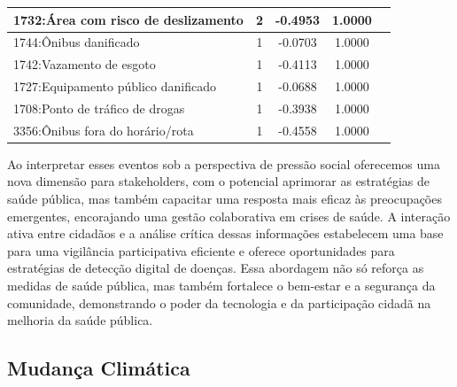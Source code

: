 \begin{table}[htbp]
\begin{tabular}{|l|c|c|c|c|}
		\hline
		1732:Área com risco de deslizamento                   & 2                & -0.4953        & 1.0000           \\
		\hline
		1744:Ônibus danificado                                & 1                & -0.0703        & 1.0000           \\
		\hline
		1742:Vazamento de esgoto                              & 1                & -0.4113        & 1.0000           \\
		\hline
		1727:Equipamento público danificado                   & 1                & -0.0688        & 1.0000           \\
		\hline
		1708:Ponto de tráfico de drogas                       & 1                & -0.3938        & 1.0000           \\
		\hline
		3356:Ônibus fora do horário/rota                      & 1                & -0.4558        & 1.0000           \\
		\hline
	\end{tabular}
\end{table}

Ao interpretar esses eventos sob a perspectiva de pressão social oferecemos uma nova dimensão para stakeholders, com o potencial aprimorar as estratégias de saúde pública, mas também capacitar uma resposta mais eficaz às preocupações emergentes, encorajando uma gestão colaborativa em crises de saúde. A interação ativa entre cidadãos e a análise crítica dessas informações estabelecem uma base para uma vigilância participativa eficiente e oferece oportunidades para estratégias de detecção digital de doenças. Essa abordagem não só reforça as medidas de saúde pública, mas também fortalece o bem-estar e a segurança da comunidade, demonstrando o poder da tecnologia e da participação cidadã na melhoria da saúde pública.

\subsection{Mudança Climática}

